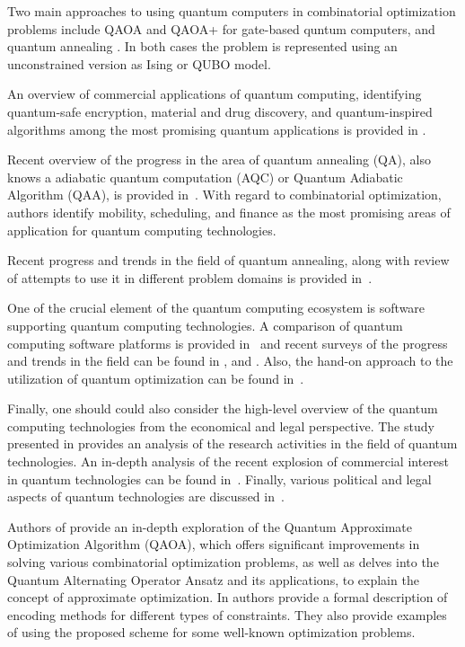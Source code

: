 \documentclass[a4paper,11pt]{article}
\begin{document}
Two main approaches to using quantum computers in combinatorial optimization problems include QAOA \cite{farhi2014quantum} and QAOA+ \cite{hadfield2019quantum} for gate-based quntum computers, and quantum annealing \cite{canivell2021startup}. In both cases the problem is represented using an unconstrained version as Ising  \cite{lucas2014ising} or QUBO \cite{glover2018tutorial} model. 

An overview of commercial applications of quantum computing, identifying  quantum-safe encryption, material and drug discovery, and quantum-inspired algorithms among the most promising quantum applications is provided in \cite{bova2021commercial}. 

Recent overview of the progress in the area of quantum annealing (QA), also knows a adiabatic quantum computation (AQC) or Quantum Adiabatic Algorithm (QAA), is provided in~\cite{yarkoni2022quantum}. With regard to combinatorial optimization, authors identify mobility, scheduling, and finance as the most promising areas of application for quantum computing technologies.

Recent progress and trends in the field of quantum annealing, along with review of attempts to use it in different problem domains is provided in~\cite{yulianti2022implementation}.

One of the crucial element of the quantum computing ecosystem is software supporting quantum computing technologies. A comparison of quantum computing software platforms is provided in~\cite{larose2019overview} and recent surveys of the progress and trends in the field can be found in \cite{zhao2020quantum}, \cite{gill2021quantum} and \cite{miszczak2023symbolic}. Also, the hand-on approach to the utilization of quantum optimization can be found in~\cite{combarro2023practical}.

Finally, one should could also consider the high-level overview of the quantum computing technologies from the economical and legal perspective.
The study presented in \cite{seskir2021landscape} provides an analysis of the research activities in the field of quantum technologies. An in-depth analysis of the recent explosion of commercial interest in quantum technologies can be found in~\cite{seskir2022landscape}. Finally, various political and legal aspects of quantum technologies are discussed in~\cite{hoofnagle2021law}. 


Authors of \cite{choi2019tutorial} provide an in-depth exploration of the Quantum Approximate Optimization Algorithm (QAOA), which offers significant improvements in solving various combinatorial optimization problems, as well as delves into the Quantum Alternating Operator Ansatz and its applications,  to explain the concept of approximate optimization. In \cite{ruan2023quantum} authors provide a formal description of encoding methods for different types of constraints. They also provide examples of using the proposed scheme for some well-known optimization problems.
\end{document}
